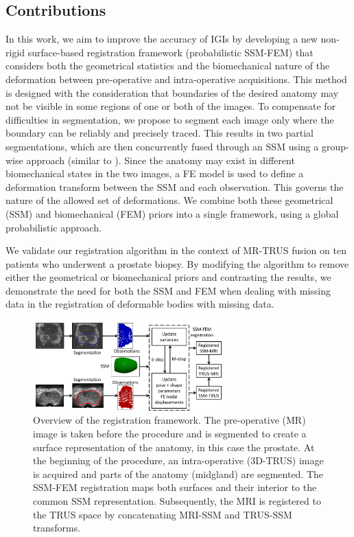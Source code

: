 \documentclass[journal]{IEEEtran}
\begin{document}
\subsection{Contributions}
In this work, we aim to improve the accuracy of IGIs by developing a new non-rigid surface-based registration framework (probabilistic SSM-FEM) that considers both the geometrical statistics and the biomechanical nature of the deformation between pre-operative and intra-operative acquisitions. This method is designed with the consideration that boundaries of the desired anatomy may not be visible in some regions of one or both of the images.  To compensate for difficulties in segmentation, we propose to segment each image only where the boundary can be reliably and precisely traced. This results in two partial segmentations, which are then concurrently fused through an SSM using a group-wise approach (similar to \cite{Rasoulian13a}). Since the anatomy may exist in different biomechanical states in the two images, a FE model is used to define a deformation transform between the SSM and each observation.  This governs the nature of the allowed set of deformations.  We combine both these geometrical (SSM) and biomechanical (FEM) priors into a single framework, using a global probabilistic approach.

We validate our registration algorithm in the context of MR-TRUS fusion on ten patients who underwent a prostate biopsy. By modifying the algorithm to remove either the geometrical or biomechanical priors and contrasting the results, we demonstrate the need for both the SSM and FEM when dealing with missing data in the registration of deformable bodies with missing data.
\begin{figure}[t]
\center
\includegraphics[width = 0.65\textwidth]{images/workflow.png}
\caption{Overview of the registration framework. The pre-operative (MR) image is taken before the procedure and is segmented to create a surface representation of the anatomy, in this case the prostate. At the beginning of the procedure, an intra-operative (3D-TRUS) image is acquired and parts of the anatomy (midgland) are segmented. The SSM-FEM registration maps both surfaces and their interior to the common SSM representation. Subsequently, the MRI is registered to the TRUS space by concatenating MRI-SSM and TRUS-SSM transforms.}
\label{fig:workflow}
\end{figure}
\end{document}
